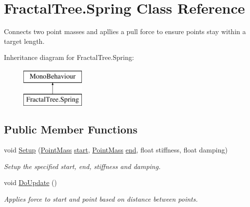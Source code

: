 \hypertarget{class_fractal_tree_1_1_spring}{}\section{Fractal\+Tree.\+Spring Class Reference}
\label{class_fractal_tree_1_1_spring}


Connects two point masses and apllies a pull force to ensure points stay within a target length.  


Inheritance diagram for Fractal\+Tree.\+Spring\+:\begin{figure}[H]
\begin{center}
\leavevmode
\includegraphics[height=2.000000cm]{class_fractal_tree_1_1_spring}
\end{center}
\end{figure}
\subsection*{Public Member Functions}
\begin{DoxyCompactItemize}
\item 
void \hyperlink{class_fractal_tree_1_1_spring_a49e3b32769c76e626650280f6016996d}{Setup} (\hyperlink{class_fractal_tree_1_1_point_mass}{Point\+Mass} \hyperlink{class_fractal_tree_1_1_spring_a4008f4f4f6404df50062047b0afa2ec8}{start}, \hyperlink{class_fractal_tree_1_1_point_mass}{Point\+Mass} \hyperlink{class_fractal_tree_1_1_spring_a22f6b5200ab129728b9fbb06b5faca1f}{end}, float stiffness, float damping)
\begin{DoxyCompactList}\small\item\em Setup the specified start, end, stiffness and damping. \end{DoxyCompactList}\item 
void \hyperlink{class_fractal_tree_1_1_spring_a38d6d4709c69509ef73c1725a53e470a}{Do\+Update} ()
\begin{DoxyCompactList}\small\item\em Applies force to start and point based on distance between points. \end{DoxyCompactList}\end{DoxyCompactItemize}
